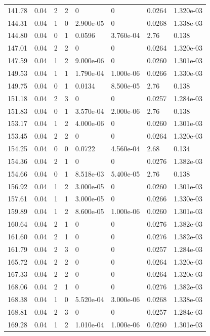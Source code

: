 \documentclass[preview]{standalone}
\begin{document}
{{{{\begin{tabular}{L{1.2cm}C{1.2cm} C{0.3cm}C{0.5cm} C{1.4cm}C{1.4cm} C{1.4cm}C{1.4cm}}
  141.78  &  0.04  & 2     &  2 &  0  & 0  & 0.0264 &  1.320e-03   \\ 
  144.31  &  0.04  & 1     &  0 &  2.900e-05  & 0  & 0.0268 &  1.338e-03   \\ 
  144.80  &  0.04  & 0     &  1 &  0.0596  & 3.760e-04  & 2.76 &  0.138   \\ 
  147.01  &  0.04  & 2     &  2 &  0  & 0  & 0.0264 &  1.320e-03   \\ 
  147.59  &  0.04  & 1     &  2 &  9.000e-06  & 0  & 0.0260 &  1.301e-03   \\ 
  149.53  &  0.04  & 1     &  1 &  1.790e-04  & 1.000e-06  & 0.0266 &  1.330e-03   \\ 
  149.75  &  0.04  & 0     &  1 &  0.0134  & 8.500e-05  & 2.76 &  0.138   \\ 
  151.18  &  0.04  & 2     &  3 &  0  & 0  & 0.0257 &  1.284e-03   \\ 
  151.83  &  0.04  & 0     &  1 &  3.570e-04  & 2.000e-06  & 2.76 &  0.138   \\ 
  153.17  &  0.04  & 1     &  2 &  4.000e-06  & 0  & 0.0260 &  1.301e-03   \\ 
  153.45  &  0.04  & 2     &  2 &  0  & 0  & 0.0264 &  1.320e-03   \\ 
  154.25  &  0.04  & 0     &  0 &  0.0722  & 4.560e-04  & 2.68 &  0.134   \\ 
  154.36  &  0.04  & 2     &  1 &  0  & 0  & 0.0276 &  1.382e-03   \\ 
  154.66  &  0.04  & 0     &  1 &  8.518e-03  & 5.400e-05  & 2.76 &  0.138   \\ 
  156.92  &  0.04  & 1     &  2 &  3.000e-05  & 0  & 0.0260 &  1.301e-03   \\ 
  157.61  &  0.04  & 1     &  1 &  3.000e-05  & 0  & 0.0266 &  1.330e-03   \\ 
  159.89  &  0.04  & 1     &  2 &  8.600e-05  & 1.000e-06  & 0.0260 &  1.301e-03   \\ 
  160.64  &  0.04  & 2     &  1 &  0  & 0  & 0.0276 &  1.382e-03   \\ 
  161.60  &  0.04  & 2     &  1 &  0  & 0  & 0.0276 &  1.382e-03   \\ 
  161.79  &  0.04  & 2     &  3 &  0  & 0  & 0.0257 &  1.284e-03   \\ 
  165.72  &  0.04  & 2     &  2 &  0  & 0  & 0.0264 &  1.320e-03   \\ 
  167.33  &  0.04  & 2     &  2 &  0  & 0  & 0.0264 &  1.320e-03   \\ 
  168.06  &  0.04  & 2     &  1 &  0  & 0  & 0.0276 &  1.382e-03   \\ 
  168.38  &  0.04  & 1     &  0 &  5.520e-04  & 3.000e-06  & 0.0268 &  1.338e-03   \\ 
  168.81  &  0.04  & 2     &  3 &  0  & 0  & 0.0257 &  1.284e-03   \\ 
  169.28  &  0.04  & 1     &  2 &  1.010e-04  & 1.000e-06  & 0.0260 &  1.301e-03   \\ 
\hline 
\end{tabular} 

}}}}
\end{document}
